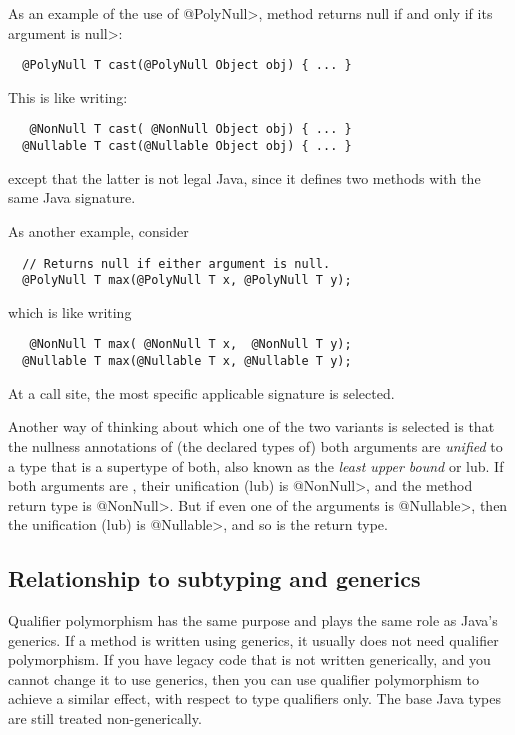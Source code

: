 As an example of the use of \<@PolyNull>, method
returns null if and only if its argument is \<null>:

\begin{Verbatim}
  @PolyNull T cast(@PolyNull Object obj) { ... }
\end{Verbatim}

\noindent
This is like writing:

\begin{Verbatim}
   @NonNull T cast( @NonNull Object obj) { ... }
  @Nullable T cast(@Nullable Object obj) { ... }
\end{Verbatim}

\noindent
except that the latter is not legal Java, since it defines two
methods with the same Java signature.


As another example, consider

\begin{Verbatim}
  // Returns null if either argument is null.
  @PolyNull T max(@PolyNull T x, @PolyNull T y);
\end{Verbatim}

\noindent
which is like writing

\begin{Verbatim}
   @NonNull T max( @NonNull T x,  @NonNull T y);
  @Nullable T max(@Nullable T x, @Nullable T y);
\end{Verbatim}

\noindent
At a call site, the most specific applicable signature is selected.

Another way of thinking about which one of the two  variants is
selected is that the nullness annotations of (the declared types of) both
arguments are \emph{unified} to a type that is a supertype of both, also
known as the \emph{least upper bound} or lub.  If both
arguments are , their unification (lub) is \<@NonNull>, and the
method return type is \<@NonNull>.  But if even one of the arguments is \<@Nullable>,
then the unification (lub) is \<@Nullable>, and so is the return type.



\subsection{Relationship to subtyping and generics\label{qualifier-polymorhism-vs-subtyping}}

Qualifier polymorphism has the same purpose and plays the same role as
Java's generics.  If a method is written using generics, it usually does
not need qualifier polymorphism.  If you have legacy code that is not
written generically, and you cannot change it to use generics, then you can
use qualifier polymorphism to achieve a similar effect, with respect to
type qualifiers only.  The base Java types are still treated non-generically.

